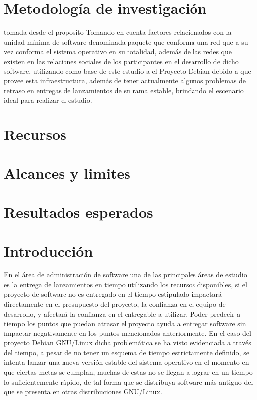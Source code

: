 \documentclass[12pt]{report}
\begin{document}
\chapter*{Metodología  de investigación}  %
tomada desde el proposito Tomando  en cuenta factores relacionados con
la unidad mínima  de software denominada paquete que  conforma una red
que a su vez conforma el  sistema operativo en su totalidad, además de
las redes que existen en  las relaciones sociales de los participantes
en  el desarrollo  de dicho  software,  utilizando como  base de  este
estudio a el Proyecto Debian debido a que provee esta infraestructura,
además de tener  actualmente algunos problemas de  retraso en entregas
de lanzamientos de su rama  estable, brindando el escenario ideal para
realizar el estudio.

\chapter*{Recursos}

\chapter*{Alcances y limites}

\chapter*{Resultados esperados}


\chapter*{Introducción}En el área de administración de software una de
las  principales áreas  de estudio  es la  entrega de  lanzamientos en
tiempo utilizando los recursos disponibles, si el proyecto de software
no es entregado  en el tiempo estipulado impactará  directamente en el
presupuesto del proyecto,  la confianza en el equipo  de desarrollo, y
afectará la  confianza en el  entregable a utilizar. Poder  predecir a
tiempo  los puntos  que puedan  atrasar el  proyecto ayuda  a entregar
software  sin   impactar  negativamente  en  los   puntos  mencionados
anteriormente.  En  el  caso   del  proyecto  Debian  GNU/Linux  dicha
problemática se ha  visto evidenciada a través del tiempo,  a pesar de
no  tener un  esquema  de tiempo  estrictamente  definido, se  intenta
lanzar una nueva  versión estable del sistema operativo  en el momento
en que ciertas metas se cumplan, muchas de estas no se llegan a lograr
en un tiempo lo suficientemente rápido, de tal forma que se distribuya
software  más antiguo  del  que se  presenta  en otras  distribuciones
GNU/Linux.
\end{document}
